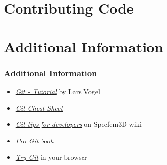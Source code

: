 \documentclass{beamer}
\begin{document}
\section{Contributing Code}

\section{Additional Information}

\begin{frame}
 \frametitle{Additional Information}

 \begin{itemize}
  \item \href{http://www.vogella.com/tutorials/Git/article.html}{\textit{Git - Tutorial}}
   by Lars Vogel
  \item \href{http://www.git-tower.com/blog/git-cheat-sheet/}{\textit{Git Cheat Sheet}}
  \item \href{https://github.com/geodynamics/specfem3d/wiki/Git-tips-for-developers}{\textit{Git tips for developers}}
   on Specfem3D wiki
  \item \href{http://git-scm.com/book}{\textit{Pro Git book}}
  \item \href{https://try.github.io/levels/1/challenges/1}{\textit{Try Git}}
   in your browser
 \end{itemize}
\end{frame}
\end{document}
